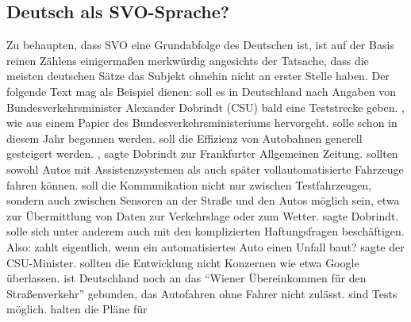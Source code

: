 
\subsection{Deutsch als SVO-Sprache?}

Zu behaupten, dass SVO eine Grundabfolge des Deutschen ist, ist auf der Basis reinen Zählens einigermaßen merkwürdig angesichts der
Tatsache, dass die meisten deutschen Sätze das Subjekt ohnehin nicht an erster Stelle haben. Der folgende Text
mag als Beispiel dienen:
\eanoraggedright
{} soll es in Deutschland nach Angaben von Bundes\-ver\-kehrs\-mi\-nis\-ter
Alexander Dobrindt (CSU) bald eine Teststrecke geben.  , wie aus einem Papier des
Bundesverkehrsministeriums hervorgeht. 
solle schon in diesem Jahr begonnen werden.  soll die Effizienz von
Autobahnen generell gesteigert werden. , sagte Dobrindt zur Frankfurter
Allgemeinen Zeitung.   sollten sowohl Autos mit Assistenzsystemen als auch
später vollautomatisierte Fahrzeuge fahren können.  soll die Kommunikation nicht nur
zwischen Testfahrzeugen, sondern auch zwi\-schen Sensoren an der Straße und den Autos möglich sein,
etwa zur Übermittlung von Daten zur Verkehrslage oder zum Wetter.  sagte Dobrindt.  solle sich unter anderem auch mit den
komplizierten Haftungsfragen beschäftigen.  Also:  zahlt eigentlich, wenn ein
automatisiertes Auto einen Unfall baut?   sagte der
CSU-Minister.  sollten die Entwicklung nicht Konzernen wie etwa
Google überlassen.   ist Deutschland noch an das "`Wiener Über\-ein\-kom\-men für den
Straßenverkehr"' gebunden, das Autofahren ohne Fahrer nicht zulässt.  sind Tests möglich.   halten die Pläne für
